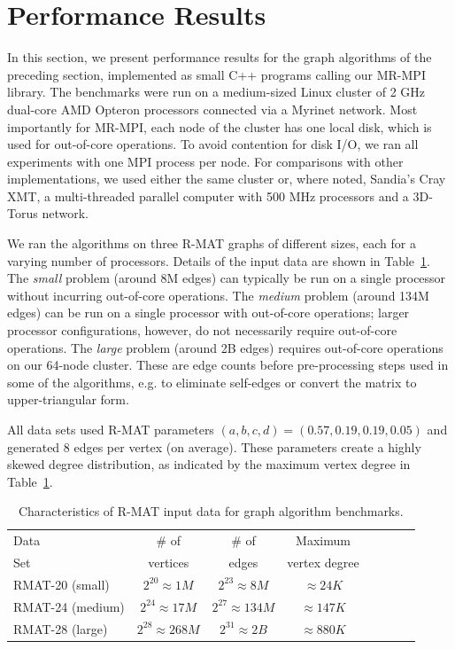 \section{Performance Results}
\label{sec:results}

In this section, we present performance results for the graph
algorithms of the preceding section, implemented as small C++
programs calling our MR-MPI library.  The benchmarks were run on a
medium-sized Linux cluster of 2 GHz dual-core AMD Opteron processors
connected via a Myrinet network.  Most importantly for MR-MPI, each
node of the cluster has one local disk, which is used for out-of-core
operations.  To avoid contention for disk I/O, we ran all experiments
with one MPI process per node.  For comparisons with other
implementations, we used either the same cluster or, where noted,
Sandia's Cray XMT, a multi-threaded parallel computer with 500 {MHz}
processors and a 3D-Torus network.

We ran the algorithms on three R-MAT graphs of different sizes, each
for a varying number of processors.  Details of the input data are
shown in Table~\ref{t:rmats}.  The {\it small} problem (around 8M
edges) can typically be run on a single processor without incurring
out-of-core operations.  The {\it medium} problem (around 134M edges)
can be run on a single processor with out-of-core operations; larger
processor configurations, however, do not necessarily require
out-of-core operations.  The {\it large} problem (around 2B edges)
requires out-of-core operations on our 64-node cluster.  These are
edge counts before pre-processing steps used in some of the
algorithms, e.g. to eliminate self-edges or convert the matrix to
upper-triangular form.


All data sets used R-MAT parameters $(a, b, c, d) = (0.57, 0.19, 0.19,
0.05)$ and generated 8 edges per vertex (on average).  These
parameters create a highly skewed degree distribution, as indicated by
the maximum vertex degree in Table~\ref{t:rmats}.

\begin{table}
\begin{center}
\begin{tabular}{|l|c|c|c|c|c|c|c|}
\hline
Data & \# of    & \# of & Maximum \\
Set  & vertices & edges & vertex degree\\
\hline
RMAT-20 (small)   &$2^{20} \approx 1M$ & $2^{23} \approx 8M$ &  $\approx 24K$ \\
RMAT-24 (medium)  &$2^{24} \approx 17M$ & $2^{27} \approx 134M$ &  $\approx 147K$ \\
RMAT-28 (large)   &$2^{28} \approx 268M$ & $2^{31} \approx 2B$& $\approx 880K$ \\
\hline
\end{tabular}
\caption{Characteristics of R-MAT input data for graph algorithm
benchmarks.}
\label{t:rmats}
\end{center}
\end{table}

